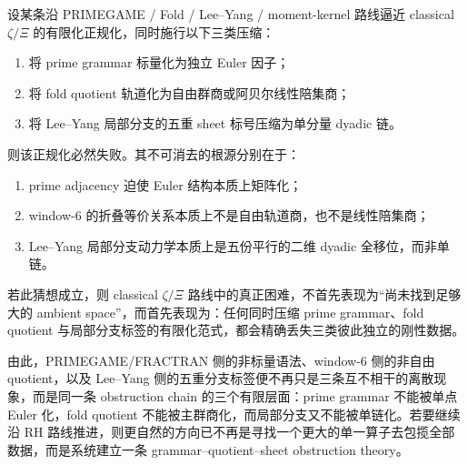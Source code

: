 \begin{conjecture}\label{conj:xi-time-part9zp-grammar-quotient-sheet-incompressible-kernel}
设某条沿 PRIMEGAME / Fold / Lee--Yang / moment-kernel 路线逼近 classical \(\zeta/\Xi\) 的有限化正规化，同时施行以下三类压缩：
\begin{enumerate}
  \item 将 prime grammar 标量化为独立 Euler 因子；
  \item 将 fold quotient 轨道化为自由群商或阿贝尔线性陪集商；
  \item 将 Lee--Yang 局部分支的五重 sheet 标号压缩为单分量 dyadic 链。
\end{enumerate}
则该正规化必然失败。其不可消去的根源分别在于：
\begin{enumerate}
  \item prime adjacency 迫使 Euler 结构本质上矩阵化；
  \item window-\(6\) 的折叠等价关系本质上不是自由轨道商，也不是线性陪集商；
  \item Lee--Yang 局部分支动力学本质上是五份平行的二维 dyadic 全移位，而非单链。
\end{enumerate}
若此猜想成立，则 classical \(\zeta/\Xi\) 路线中的真正困难，不首先表现为“尚未找到足够大的 ambient space”，而首先表现为：任何同时压缩 prime grammar、fold quotient 与局部分支标签的有限化范式，都会精确丢失三类彼此独立的刚性数据。
\end{conjecture}

\noindent
由此，PRIMEGAME/FRACTRAN 侧的非标量语法、window-\(6\) 侧的非自由 quotient，以及 Lee--Yang 侧的五重分支标签便不再只是三条互不相干的离散现象，而是同一条 obstruction chain 的三个有限层面：prime grammar 不能被单点 Euler 化，fold quotient 不能被主群商化，而局部分支又不能被单链化。若要继续沿 RH 路线推进，则更自然的方向已不再是寻找一个更大的单一算子去包揽全部数据，而是系统建立一条 grammar--quotient--sheet obstruction theory。

\endinput
